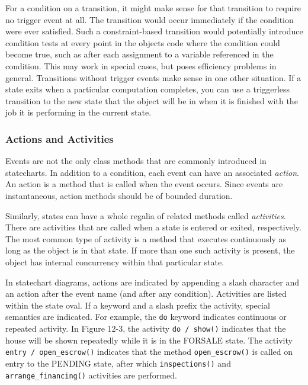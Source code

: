 For a condition on a transition, it might make sense for that
transition to require no trigger event at all. The transition would
occur immediately if the condition were ever satisfied. Such a
constraint-based transition would potentially introduce condition tests
at every point in the object{\textquotesingle}s code where the
condition could become true, such as after each assignment to a
variable referenced in the condition. This may work in special
cases, but poses efficiency problems in general. Transitions without
trigger events make sense in one other situation. If a state exits when
a particular computation completes, you can use a triggerless
transition to the new state that the object will be in when it is
finished with the job it is performing in the current state.

\subsubsection{Actions and Activities}

Events are not the only class methods that are commonly introduced in
statecharts. In addition to a condition, each event can have an
associated \textit{action}. An action is a
method that is called when the event occurs. Since events are
instantaneous, action methods should be of bounded duration.

Similarly, states can have a whole regalia of related methods called
\textit{activities}. There are activities
that are called when a state is entered or exited, respectively. The
most common type of activity is a method that executes continuously as
long as the object is in that state. If more than one such activity is
present, the object has internal concurrency within that particular
state.

In statechart diagrams, actions are indicated by appending a slash
character and an action after the event name (and after any
condition). Activities are listed within the state
oval. If a keyword and a slash prefix the activity, special semantics
are indicated. For example, the \texttt{do} keyword indicates
continuous or repeated activity. In Figure 12-3, the activity
\texttt{do / show()} indicates that the house will be shown repeatedly
while it is in the FORSALE state. The activity \texttt{entry /
open\_escrow()} indicates that the method \texttt{open\_escrow()} is
called on entry to the PENDING state, after which
\texttt{inspections()} and \texttt{arrange\_financing()} activities are
performed.


